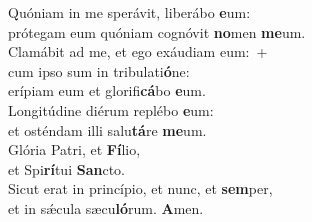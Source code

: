 \evenverse Quóniam in me sperávit, liberábo \textbf{e}um:~\*\\
\evenverse prótegam eum quóniam cognóvit \textbf{no}men \textbf{me}um.\\
\oddverse Clamábit ad me, et ego exáudiam eum:~+\\
\oddverse  cum ipso sum in tribulati\textbf{ó}ne:~\*\\
\oddverse erípiam eum et glorifi\textbf{cá}bo \textbf{e}um.\\
\evenverse Longitúdine diérum replébo \textbf{e}um:~\*\\
\evenverse et osténdam illi salu\textbf{tá}re \textbf{me}um.\\
\oddverse Glória Patri, et \textbf{Fí}lio,~\*\\
\oddverse et Spi\textbf{rí}tui \textbf{San}cto.\\
\evenverse Sicut erat in princípio, et nunc, et \textbf{sem}per,~\*\\
\evenverse et in sǽcula sæcu\textbf{ló}rum. \textbf{A}men.\\
